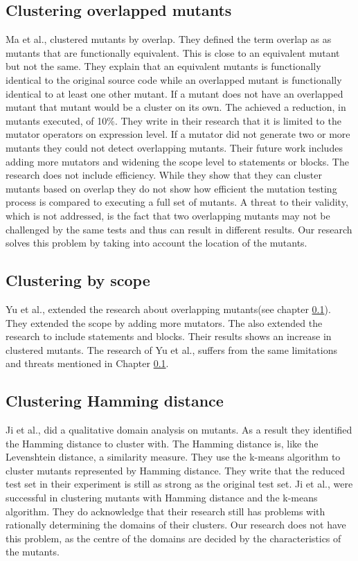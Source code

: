 \documentclass[conference,draftclsnofoot,onecolumn]{IEEEtran}
\begin{document}
\subsection{Clustering overlapped mutants}
\label{ch:overlapping_mutants}
Ma et al., clustered mutants by overlap\cite{Ma2016}.
They defined the term overlap as as mutants that are functionally equivalent.
This is close to an equivalent mutant but not the same.
They explain that an equivalent mutants is functionally identical to the original source code while an overlapped mutant is functionally identical to at least one other mutant.
If a mutant does not have an overlapped mutant that mutant would be a cluster on its own.
The achieved a reduction, in mutants executed, of 10\%.
They write in their research that it is limited to the mutator operators on expression level. 
If a mutator did not generate two or more mutants they could not detect overlapping mutants.
Their future work includes adding more mutators and widening the scope level to statements or blocks.
\newline
The research does not include efficiency.
While they show that they can cluster mutants based on overlap they do not show how efficient the mutation testing process is compared to executing a full set of mutants.
A threat to their validity, which is not addressed, is the fact that two overlapping mutants may not be challenged by the same tests and thus can result in different results.
Our research solves this problem by taking into account the location of the mutants.

\subsection{Clustering by scope}
Yu et al., extended the research about overlapping mutants(see chapter \ref{ch:overlapping_mutants})\cite{Yu2019PossibilityScope}.
They extended the scope by adding more mutators.
The also extended the research to include statements and blocks.
Their results shows an increase in clustered mutants.
The research of Yu et al., suffers from the same limitations and threats  mentioned in Chapter \ref{ch:overlapping_mutants}.

\subsection{Clustering Hamming distance}
Ji et al., did a qualitative domain analysis on mutants\cite{Ji2009}.
As a result they identified the Hamming distance to cluster with. 
The Hamming distance is, like the Levenshtein distance, a similarity measure.
They use the k-means algorithm to cluster mutants represented by Hamming distance.
They write that the reduced test set in their experiment is still as strong as the original test set\cite{Ji2009}.
\newline
Ji et al., were successful in clustering mutants with Hamming distance and the k-means algorithm.
They do acknowledge that their research still has problems with rationally determining the domains of their clusters.
Our research does not have this problem, as the centre of the domains are decided by the characteristics of the mutants.
\end{document}
